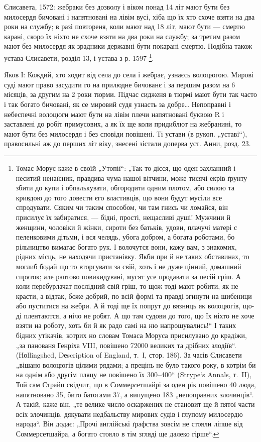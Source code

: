 Єлисавета, 1572: жебраки без дозволу і віком понад 14 літ мают бути без
милосердя бичовані і напятновані на лівім вусі, хіба що їх хто схоче взяти на
два роки на службу; в разі повтореня, коли мают над 18 літ, мают бути — смертю
карані, скоро їх ніхто не схоче взяти на два роки на службу; за третим разом
мают без милосердя як зрадники державні бути покарані смертю. Подібна також 
устава Єлисавети, розділ 13, і устава з р. 1597 \footnote{
Томас Морус каже в своїй „Утопії“: „Так то дієся, що оден захланний і неситий
ненаїсник, правдива чума нашої вітчини, може тисячі екрів ґрунту збити до купи
і обпалькувати, обгородити одним плотом, або силою та кривдою до того довести
єго властивців, що вони будут мусіли все спродувати. Сяким чи таким способом,
чи там гнись чи ломайся, він присилує їх забиратися, — бідні, прості, нещасливі
душі! Мужчини й женщини, чоловіки й жінки, сироти без батьків, удови, плачучі
матері с пеленковими дітьми, і вся челядь, убога добром, а богата
роботами, бо рільництво вимагає богато рук. І волочутся вони, кажу вам,
з знакомих, рідних місць, не находячи пристанівку. Якби при й не таких
обставинах, то моглиб бодай що то вторгувати за свій, хоть і не дуже
цінний, домашний спряток; але раптово повикидувані, мусят усе продавати
за песій гріш. А коли перебурлачат послідний свій гріш, то щож
тоді мают робити, як не красти, а відтак, боже добрий, по всій формі та
правді згинути на шибеници або пуститися на жебри. А й тоді ще їх
попрут до вязниць як волоцюгів, що-ді плентаются, а нічо не робят.
А що там судови до того, що їх ніхто не хоче взяти на роботу, хоть би
й як радо самі на ню напрошувались!“ І таких бідних утікачів, котрих
но словам Томаса Моруса присилувано до крадіжи, „за панованя Генріха
VIII, повішено \num{72000} великих та дрібних злодіїв“. (Ноllingshed, Dеscription
of England, т.~І, стор. 186). За часів Єлисавети „вішано волоцюгів
цілими рядами; а прецінь не було такого року, в котрім би на
однім або другім пляцу не повішено їх 300--400“ (Strype`s Annals, т.~II),
Той сам Страйп свідчит, що в Соммерcетшайрі за оден рік повішено 40
люда, напятновано 35, бито батогами 37, а випущено 183 „непоправних
злочинців“. А такій, каже він, „те велике число оскаржених не становит
ще й пятої части всіх злочинців, дякувати недбальству мирових судів
і глупому милосердю народа“. Він додає: „Прочі англійські ґрафства
зовсім не стояли ліпше від Соммерсетшайра, а богато стояло в тім згляді
ще далеко гірше“.
}.

Яков І: Кождий, хто ходит від села до села і жебрає,
узнаєсь волоцюгою. Мирові суді мают право засудити го на
прилюдне бичованє і за першим разом на 6 місяців, за
другим на 2 роки тюрми. Підчас сидженя в тюрмі мают
бути так часто і так богато бичовані, як се мировий судя
узнасть за добре\dots{} Непоправні і небеспечні волоцюги мают
бути на лівім плечи напятновані буквою R і заставлені до
робіт примусових, а як їх ще коли придиблют на жебранині,
то мают бути без милосердя і без сповіди повішені. Ті устави
(в рукоп. „уставі“), правосильні аж до перших літ  віку,
знесені зістали доперва  уст. Анни, розд. 23.

